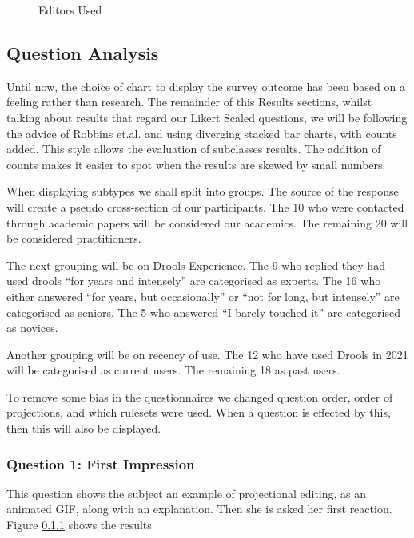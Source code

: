 \begin{figure}[h]
    \centering
    \caption{Editors Used}
    \label{fig:editorUsage}
\end{figure}


\subsection{Question Analysis}
Until now, the choice of chart to display the survey outcome has been based on a feeling rather than research. 
The remainder of this Results sections, whilst talking about results that regard our Likert Scaled questions, we will be following the advice of Robbins et.al.\cite{robbins2011plotting} and using diverging stacked bar charts, with counts added.
This style allows the evaluation of subclasses results.
The addition of counts makes it easier to spot when the results are skewed by small numbers.

When displaying subtypes we shall split into groups.
The source of the response will create a pseudo cross-section of our participants.
The 10 who were contacted through academic papers will be considered our academics.
The remaining 20 will be considered practitioners.

The next grouping will be on Drools Experience.
The 9 who replied they had used drools ``for years and intensely'' are categorised as experts.
The 16 who either answered ``for years, but occasionally'' or ``not for long, but intensely'' are categorised as seniors.
The 5 who answered ``I barely touched it'' are categorised as novices.

Another grouping will be on recency of use.
The 12 who have used Drools in 2021 will be categorised as current users.
The remaining 18 as past users.

To remove some bias in the questionnaires we changed question order, order of projections, and which rulesets were used.
When a question is effected by this, then this will also be displayed.

\subsubsection{Question 1: First Impression}
This question shows the subject an example of projectional editing, as an animated GIF, along with an explanation.
Then she is asked her first reaction.
Figure \ref{} shows the results



